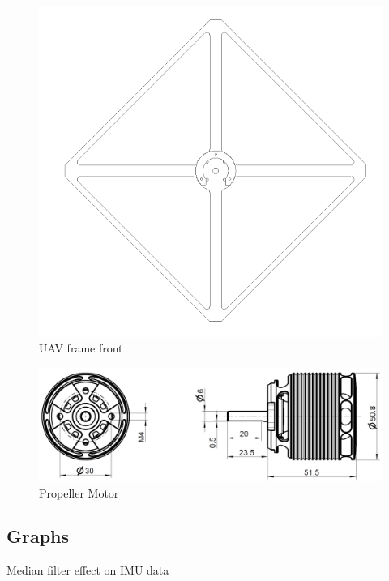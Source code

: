 \begin{figure}[H]
  \centering
  \includegraphics[scale=1]{graphics/cadfront.png}
  \caption{UAV frame front}
  \label{fig:CADfront}
\end{figure}


\begin{figure}[H]
  \includegraphics[scale=0.25]{graphics/Motor.jpg}
  \caption{Propeller Motor}
  \label{fig:Propeller Motor}
\end{figure}

\subsection{Graphs}

Median filter effect on IMU data

